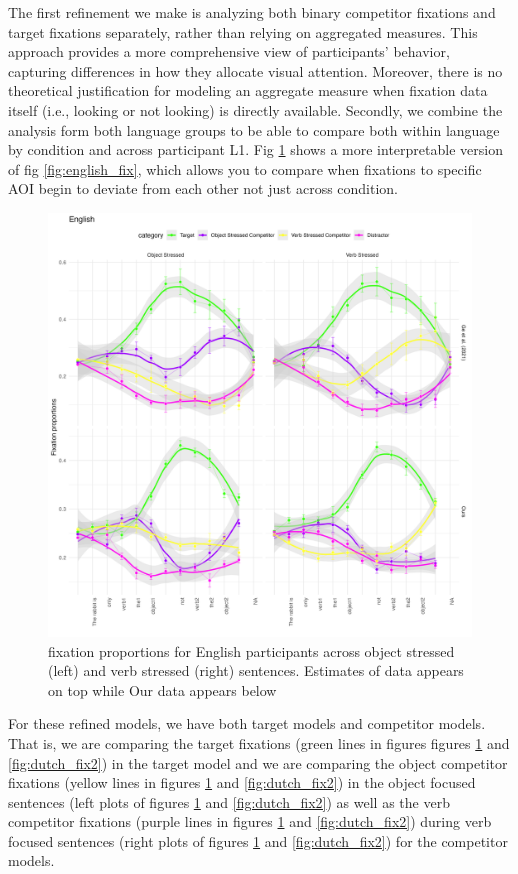 The first refinement we make is analyzing both binary competitor fixations and target fixations separately, rather than relying on aggregated measures. This approach provides a more comprehensive view of participants’ behavior, capturing differences in how they allocate visual attention. Moreover, there is no theoretical justification for modeling an aggregate measure when fixation data itself (i.e., looking or not looking) is directly available. Secondly, we combine the analysis form both language groups to be able to compare both within language by condition and across participant L1. Fig \ref{fig:english_fix2} shows a more interpretable version of fig \ref{fig:english_fix}, which allows you to compare when fixations to specific AOI begin to deviate from each other not just across condition.

\begin{figure}[H]  %
    \centering
    \includegraphics[width=\textwidth,height=\textheight,keepaspectratio]{viz/english_fix2.png}
    \caption{fixation proportions for English participants across object stressed (left) and verb stressed (right) sentences. Estimates of \citep{Ge2021} data appears on top while Our data appears below}
    \label{fig:english_fix2}
\end{figure}

For these refined models, we have both target models and competitor models. That is, we are comparing the target fixations (green lines in figures figures \ref{fig:english_fix2} and \ref{fig:dutch_fix2}) in the target model and we are comparing the object competitor fixations (yellow lines in figures \ref{fig:english_fix2} and \ref{fig:dutch_fix2}) in the object focused sentences (left plots of figures \ref{fig:english_fix2} and \ref{fig:dutch_fix2}) as well as the verb competitor fixations (purple lines in figures \ref{fig:english_fix2} and \ref{fig:dutch_fix2}) during verb focused sentences (right plots of figures \ref{fig:english_fix2} and \ref{fig:dutch_fix2}) for the competitor models. 

